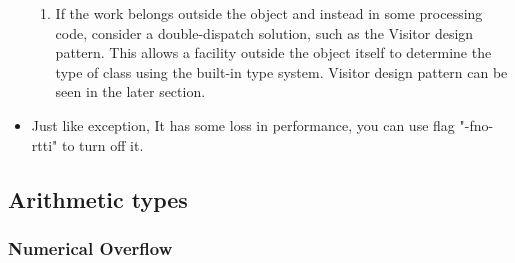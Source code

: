 \documentclass[a4paper,11pt,twoside]{book}
\begin{document}
\begin{itemize}
\begin{enumerate}
		\item If the work belongs outside the object and instead in some processing code, consider a double-dispatch solution, such as the Visitor design pattern. This allows a facility outside the object itself to determine the type of class using the built-in type system. Visitor design pattern can be seen in the later section.
	\end{enumerate}
	
	\item Just like exception, It has some loss in performance, you can use flag "-fno-rtti" to turn off it.
\end{itemize}


\subsection{Arithmetic types}
\subsubsection{Numerical Overflow}
\end{document}

